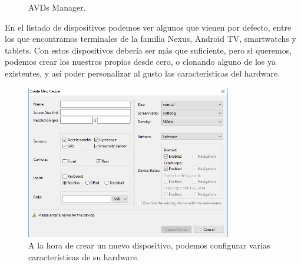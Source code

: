 \begin{figure}[htbp]
\centering
{}\hspace{0.05\textwidth}
{}
\caption{AVDs Manager.}
\end{figure}

En el listado de dispositivos podemos ver algunos que vienen por defecto, entre los que encontramos terminales de la familia Nexus, Android TV, smartwatchs y tablets. Con estos dispositivos debería ser más que suficiente, pero si queremos, podemos crear los nuestros propios desde cero, o clonando alguno de los ya existentes, y así poder personalizar al gusto las características del hardware.

\begin{figure}[H]
\centering
  \includegraphics[width=0.8\textwidth]{Figures/anexo/android_tools/avd_manager_definitions_create}
  \caption{A la hora de crear un nuevo dispositivo, podemos configurar varias características de su hardware.}
\end{figure}

